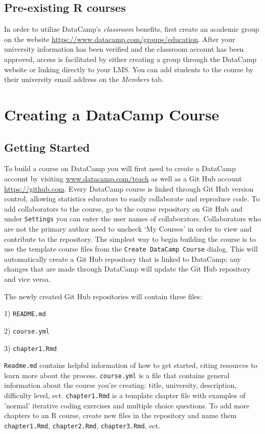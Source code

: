 \documentclass[12pt]{article}\usepackage[]{graphicx}\usepackage[]{color}
\begin{document}
\subsection{Pre-existing R courses}
In order to utilize 
DataCamp's \textit{classroom} benefits, first create an academic group on the website \url{https://www.datacamp.com/groups/education}.
After your university information has been verified and the classroom account has been approved, access is facilitated 
by either creating a group through the DataCamp website or linking directly to your LMS. You can add students to the course by their university email address on the \textit{Members} tab.
\section{Creating a DataCamp Course}
\subsection{Getting Started}
To build a course on DataCamp you will first need to create a DataCamp account by visiting \url{www.datacamp.com/teach} as well as
a Git Hub account \url{https://github.com}. Every DataCamp course is linked through Git Hub version control,
allowing statistics educators to easily collaborate and reproduce code. To add collaborators to the course, go to the course repository
on Git Hub and under \texttt{Settings} you can enter the user names of collaborators. Collaborators who are not the primary author need 
to uncheck `My Courses' in order to view and contribute to the repository. The simplest way to begin building the course is to use the template course files from the
\texttt{Create DataCamp Course} dialog. This will automatically create a Git Hub repository that is linked to DataCamp; any changes that are
made through DataCamp will update the Git Hub repository and vice versa. 

The newly created Git Hub repositories will contain three files: 

1) \texttt{README.md}

2) \texttt{course.yml}

3) \texttt{chapter1.Rmd}

\texttt{Readme.md} contains helpful information of how to get started, citing resources to learn more about the process.
\texttt{course.yml} is a file that contains general information about the course you're creating: title, university, description,
difficulty level, ect.
\texttt{chapter1.Rmd} is a template chapter file with examples of 'normal' iterative coding exercises and multiple choice questions.
To add more chapters to an R course, create new files in the repository and name them \texttt{chapter1.Rmd}, \texttt{chapter2.Rmd},
\texttt{chapter3.Rmd}, ect.
\end{document}
